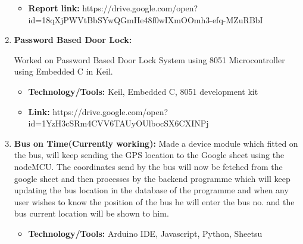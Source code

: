 \documentclass[letterpaper,11pt]{article}
\begin{document}
\begin{enumerate}
\begin{itemize}
\item \textbf{Report link:} https://drive.google.com/open?id=18qXjPWVtBbSYwQGmHe48f0wIXmOOmh3-efq-MZuRBbI
\end{itemize}

 \item \textbf {Password Based Door Lock:}

Worked on Password Based Door Lock System using 8051 Microcontroller using Embedded C in Keil. 
\begin{itemize}
\item \textbf{Technology/Tools:} Keil, Embedded C, 8051 development kit
\end{itemize}

\begin{itemize}
\item \textbf{Link:} https://drive.google.com/open?id=1YzH3cSRm4CVV6TAUyOUlbocSX6CXINPj
\end{itemize}



\item \textbf{Bus on Time(Currently working):}
 Made a device module which fitted on the bus, will keep sending the GPS location to the Google sheet using the nodeMCU. The coordinates send by the bus will now be fetched from the google sheet and then processes by the backend programme which will keep updating the bus location in the database of the programme and when any user wishes to know the position of the bus he will enter the bus no. and the bus current location will be shown to him. 
\begin{itemize}
\item \textbf{Technology/Tools:} Arduino IDE, Javascript, Python, Sheetsu
\end{itemize}

 \end{enumerate}
\end{document}
